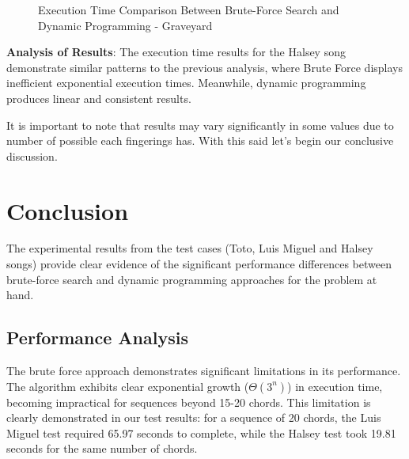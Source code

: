 \documentclass[conference]{IEEEtran}
\begin{document}
\begin{figure}[H]
    \centering
    \caption{Execution Time Comparison Between Brute-Force Search and Dynamic Programming - Graveyard}
    \label{fig:execution-time-graveyard}
\end{figure}
\textbf{Analysis of Results}: The execution time results for the Halsey song demonstrate similar patterns to the previous analysis, where Brute Force displays inefficient exponential execution times. Meanwhile, dynamic programming produces linear and consistent results. 

It is important to note that results may vary significantly in some values due to number of possible each fingerings has. With this said let's begin our conclusive discussion.


\section{Conclusion}
The experimental results from the test cases (Toto, Luis Miguel and Halsey songs) provide clear evidence of the significant performance differences between brute-force search and dynamic programming approaches for the problem at hand.

\subsection{Performance Analysis}

The brute force approach demonstrates significant limitations in its performance. The algorithm exhibits clear exponential growth (\(\Theta(3^n)\)) in execution time, becoming impractical for sequences beyond 15-20 chords. This limitation is clearly demonstrated in our test results: for a sequence of 20 chords, the Luis Miguel test required 65.97 seconds to complete, while the Halsey test took 19.81 seconds for the same number of chords.
    
\end{document}
